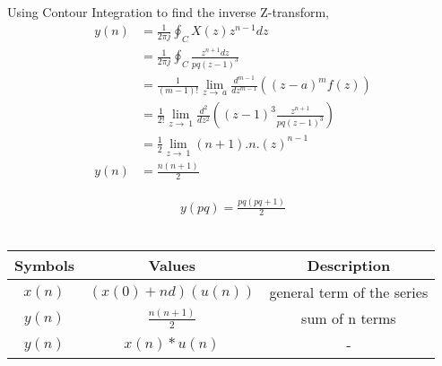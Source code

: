 \documentclass[a4,12pt,twocolumn]{IEEEtran}
\begin{document}
Using Contour Integration to find the inverse Z-transform,
\begin{align}
y(n) &= \frac{1}{2\pi j}\oint_C X(z)z^{n-1}dz \\
&= \frac{1}{2\pi j}\oint_C \frac{z^{n+1}dz}{pq(z-1)^3} \\
&= \frac{1}{(m-1)!} \lim_{z\to\ a}\frac{d^{m-1}}{dz^{m-1}} \left((z-a)^m f(z)\right) \\
&= \frac{1}{2!} \lim_{z\to\ 1}\frac{d^2}{dz^2} \left((z-1)^3 \frac{z^{n+1}}{pq(z-1)^3}\right) \\
&= \frac{1}{2} \lim_{z\to\ 1} (n+1).n.(z)^{n-1}\\
y(n) &= \frac{n(n+1)}{2}
\end{align}

\begin{align}
y(pq) = \frac{pq(pq+1)}{2}
\end{align}\\

\begin{tabular}{|c|c|c|}
    \hline
    \textbf{Symbols} & \textbf{Values} & \textbf{Description} \\
    \hline
    $x(n)$ & $(x(0) + nd)(u(n))$ & general term of the series \\
    \hline
    $y(n)$ & $ \frac{n(n+1)}{2}$ & sum of n terms \\
    \hline
    $y(n)$ & $x(n) * u(n)$ & - \\
    \hline
\end{tabular}\\
\end{document}
